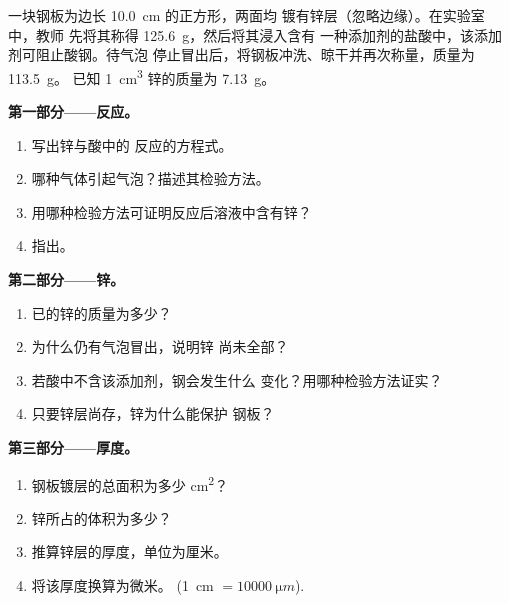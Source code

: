 \begin{problem}
\label{pb:g9:metals-acids-corrosion:1}
一块钢板为边长 \qty{10.0}{cm} 的正方形，两面均
镀有锌层（忽略边缘）。在实验室中，教师
先将其称得 \qty{125.6}{g}，然后将其浸入含有
一种添加剂的盐酸中，该添加剂可阻止酸钢。待气泡
停止冒出后，将钢板冲洗、晾干并再次称量，质量为 \qty{113.5}{g}。
已知 \qty{1}{cm^3} 锌的质量为 \qty{7.13}{g}。

\medskip
\noindent\textbf{第一部分——反应。}
\begin{enumerate}
  \item 写出锌与酸中的  
        反应的方程式。
  \item 哪种气体引起气泡？描述其检验方法。
  \item 用哪种检验方法可证明反应后溶液中含有锌？
  \item 指出。
\end{enumerate}

\medskip
\noindent\textbf{第二部分——锌。}
\begin{enumerate}[resume]
  \item 已的锌的质量为多少？
  \item 为什么仍有气泡冒出，说明锌
        尚未全部？
  \item 若酸中不含该添加剂，钢会发生什么
        变化？用哪种检验方法证实？
  \item 只要锌层尚存，锌为什么能保护
        钢板？
\end{enumerate}

\medskip
\noindent\textbf{第三部分——厚度。}
\begin{enumerate}[resume]
  \item 钢板镀层的总面积为多少 \unit{cm^2}？
  \item 锌所占的体积为多少？
  \item 推算锌层的厚度，单位为厘米。
  \item 将该厚度换算为微米。
        (\qty{1}{cm} $= \qty{10000}{\micro m}$).
\end{enumerate}
\end{problem}

